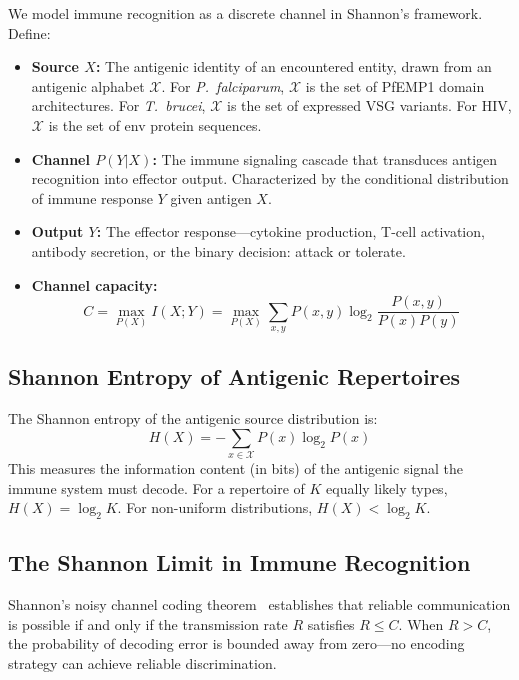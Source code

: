 \documentclass[twocolumn,10pt]{article}
\begin{document}
We model immune recognition as a discrete channel in Shannon's framework.  Define:
\begin{itemize}
\item \textbf{Source $X$:} The antigenic identity of an encountered entity, drawn from an antigenic alphabet $\mathcal{X}$.  For \textit{P.~falciparum}, $\mathcal{X}$ is the set of PfEMP1 domain architectures.  For \textit{T.~brucei}, $\mathcal{X}$ is the set of expressed VSG variants.  For HIV, $\mathcal{X}$ is the set of env protein sequences.
\item \textbf{Channel $P(Y|X)$:} The immune signaling cascade that transduces antigen recognition into effector output.  Characterized by the conditional distribution of immune response $Y$ given antigen $X$.
\item \textbf{Output $Y$:} The effector response---cytokine production, T-cell activation, antibody secretion, or the binary decision: attack or tolerate.
\item \textbf{Channel capacity:}
\begin{equation}
C = \max_{P(X)} I(X;Y) = \max_{P(X)} \sum_{x,y} P(x,y) \log_2 \frac{P(x,y)}{P(x)P(y)}
\label{eq:capacity}
\end{equation}
\end{itemize}

\subsection{Shannon Entropy of Antigenic Repertoires}

The Shannon entropy of the antigenic source distribution is:
\begin{equation}
H(X) = -\sum_{x \in \mathcal{X}} P(x) \log_2 P(x)
\label{eq:entropy}
\end{equation}
This measures the information content (in bits) of the antigenic signal the immune system must decode.  For a repertoire of $K$ equally likely types, $H(X) = \log_2 K$.  For non-uniform distributions, $H(X) < \log_2 K$.

\subsection{The Shannon Limit in Immune Recognition}

Shannon's noisy channel coding theorem~\citep{shannon1948} establishes that reliable communication is possible if and only if the transmission rate $R$ satisfies $R \leq C$.  When $R > C$, the probability of decoding error is bounded away from zero---no encoding strategy can achieve reliable discrimination.
\end{document}
